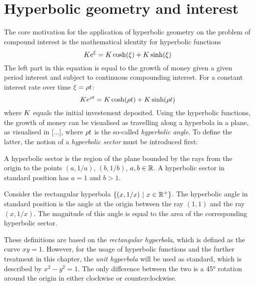 \chapter{Hyperbolic geometry and interest}

The core motivation for the application of hyperbolic geometry on the problem of compound interest is the mathematical identity for hyperbolic functions
\begin{equation}
    K e^{\xi} = K\cosh(\xi) + K\sinh(\xi)
    \label{eq:sinhcosh}
\end{equation}
The left part in this equation is equal to the growth of money given a given period interest \han and subject to continuous compounding interest. For a constant interest rate over time $\xi = \rho t$:
\begin{equation}
    K e^{\rho t} = K\cosh(\rho t) + K\sinh(\rho t)
\end{equation}
where $K$ equals the initial investement deposited. Using the hyperbolic functions, the growth of money can be visualised as travelling along a hyperbola in a plane, as visualised in [...], where $\rho t$ is the so-called \textit{hyperbolic angle}. To define the latter, the notion of a \textit{hyperbolic sector} must be introduced first:

\begin{definition}
    A hyperbolic sector is the region of the plane bounded by the rays from the origin to the points $(a, 1/a)$, $(b, 1/b)$, $a, b \in \mathbb{R}$. A hyperbolic sector in standard position has $a = 1$ and $b > 1$. 
    
\end{definition}

\begin{definition}
    Consider the rectangular hyperbola $\{(x, 1/x)\ \vert\ x \in \mathbb{R}^+\}$. The hyperbolic angle in standard position is the angle at the origin between the ray $(1, 1)$ and the ray $(x, 1/x)$. The magnitude of this angle is equal to the area of the corresponding hyperbolic sector.
\end{definition}
These definitions are based on the \textit{rectangular hyperbola}, which is defined as the curve $xy = 1$. However, for the usage of hyperbolic functions and the further treatment in this chapter, the \textit{unit hyperbola} will be used as standard, which is described by $x^2 - y^2 = 1$. The only difference between the two is a \ang{45} rotation around the origin in either clockwise or counterclockwise. 

